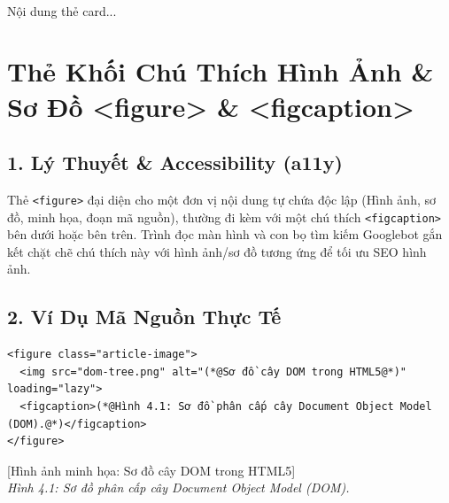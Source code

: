 \documentclass[11pt,oneside]{book}
\newcommand{\codeinline}[1]{\textcolor{accentOrange}{\texttt{#1}}}
\begin{document}
\begin{browserWindow}
\sffamily\small
\begin{tcolorbox}[colback=white, colframe=gray!30, arc=4pt]
 \\[4pt]
Nội dung thẻ card...
\end{tcolorbox}
\end{browserWindow}

\section{Thẻ Khối Chú Thích Hình Ảnh \& Sơ Đồ <figure> \& <figcaption>}
\subsection{1. Lý Thuyết \& Accessibility (a11y)}
Thẻ \codeinline{<figure>} đại diện cho một đơn vị nội dung tự chứa độc lập (Hình ảnh, sơ đồ, minh họa, đoạn mã nguồn), thường đi kèm với một chú thích \codeinline{<figcaption>} bên dưới hoặc bên trên. Trình đọc màn hình và con bọ tìm kiếm Googlebot gắn kết chặt chẽ chú thích này với hình ảnh/sơ đồ tương ứng để tối ưu SEO hình ảnh.

\subsection{2. Ví Dụ Mã Nguồn Thực Tế}
\begin{codeWindow}
\begin{lstlisting}[language=HTML5]
<figure class="article-image">
  <img src="dom-tree.png" alt="(*@Sơ đồ cây DOM trong HTML5@*)" loading="lazy">
  <figcaption>(*@Hình 4.1: Sơ đồ phân cấp cây Document Object Model (DOM).@*)</figcaption>
</figure>
\end{lstlisting}
\end{codeWindow}

\begin{browserWindow}
\sffamily\small
\begin{tcolorbox}[colback=gray!10, colframe=gray!30, width=0.85\linewidth, arc=4pt]
\centering
\textcolor{gray!80}{\small [Hình ảnh minh họa: Sơ đồ cây DOM trong HTML5]}\\[6pt]
\textit{\small Hình 4.1: Sơ đồ phân cấp cây Document Object Model (DOM).}
\end{tcolorbox}
\end{browserWindow}
\end{document}
